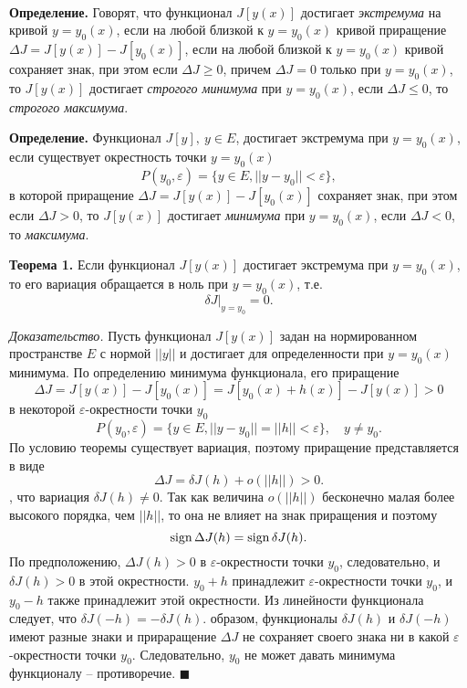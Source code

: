 \documentclass[9pt]{article}
\begin{document}
\ 
\par\textbf{Определение.} Говорят, что функционал \(J[y(x)]\) достигает \textit{экстремума} на кривой \(y=y_0(x)\), если на любой близкой к \(y=y_0(x)\) кривой приращение \(\Delta J=J[y(x)]-J[y_0(x)]\), если на любой близкой к \(y=y_0(x)\) кривой сохраняет знак, при этом если \(\Delta J\ge0\), причем \(\Delta J=0\) только при \(y=y_0(x)\), то \(J[y(x)]\) достигает \textit{строгого минимума} при \(y=y_0(x)\), если \(\Delta J\le0\), то \textit{строгого максимума}.
\par\textbf{Определение.} Функционал \(J[y],\ y\in E\), достигает экстремума при \(y=y_0(x)\), если существует окрестность точки \(y=y_0(x)\)\[P(y_0,\varepsilon)=\{y\in E, ||y-y_0||<\varepsilon\},\]в которой приращение \(\Delta J=J[y(x)]-J[y_0(x)]\) сохраняет знак, при этом если \(\Delta J>0\), то \(J[y(x)]\) достигает \textit{минимума} при \(y=y_0(x)\), если \(\Delta J<0\), то \textit{максимума}.
\par\textbf{Теорема 1.} Если функционал \(J[y(x)]\) достигает экстремума при \(y=y_0(x)\), то его вариация обращается в ноль при \(y=y_0(x)\), т.е.\[\delta J|_{y=y_0}=0.\]
\par\textit{Доказательство.} Пусть функционал \(J[y(x)]\) задан на нормированном пространстве \(E\) с нормой \(||y||\) и достигает для определенности при \(y=y_0(x)\) минимума. По определению минимума функционала, его приращение \[\Delta J=J[y(x)]-J[y_0(x)]=J[y_0(x)+h(x)]-J[y(x)]>0\]в некоторой \(\varepsilon\)-окрестности точки \(y_0\)\[P(y_0,\varepsilon)=\{y\in E,||y-y_0||=||h||<\varepsilon\},\quad y\neq y_0.\]
По условию теоремы существует вариация, поэтому приращение представляется в виде \[\Delta J=\delta J(h)+o(||h||) > 0.\]
\parПредположим, что вариация \(\delta J(h)\neq0\). Так как величина \(o(||h||)\) бесконечно малая более высокого порядка, чем \(||h||\), то она не влияет на знак приращения и поэтому \[\operatorname{sign}\Delta J(h)=\operatorname{sign}\delta J(h).\]По предположению, \(\Delta J(h)>0\) в \(\varepsilon\)-окрестности точки \(y_0\), следовательно, и \(\delta J(h)>0\) в этой окрестности.
\parЕсли \(y_0+h\) принадлежит \(\varepsilon\)-окрестности точки \(y_0\), и \(y_0-h\) также принадлежит этой окрестности. Из линейности функционала следует, что \(\delta J(-h)=-\delta J(h)\).
\parТаким образом, функционалы \(\delta J(h)\) и \(\delta J(-h)\) имеют разные знаки и прираращение \(\Delta J\) не сохраняет своего знака ни в какой \(\varepsilon\)-окрестности точки \(y_0\). Следовательно, \(y_0\) не может давать минимума функционалу -- противоречие. \(\blacksquare\)
\end{document}
